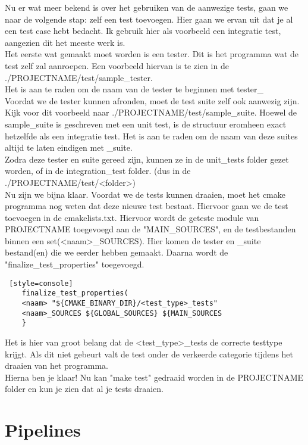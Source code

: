 \documentclass{article}
\begin{document}
Nu er wat meer bekend is over het gebruiken van de aanwezige tests, gaan we naar de volgende stap: zelf een test toevoegen. Hier gaan we ervan uit dat je al een test case hebt bedacht. 
Ik gebruik hier als voorbeeld een integratie test, aangezien dit het meeste werk is. 
\\
Het eerste wat gemaakt moet worden is een tester. Dit is het programma wat de test zelf zal aanroepen. Een voorbeeld hiervan is te zien in de \\ ./PROJECTNAME/test/sample\_tester. \\Het is aan te raden om de naam van de tester te beginnen met tester\_<de rest> 
\\
Voordat we de tester kunnen afronden, moet de test suite zelf ook aanwezig zijn. Kijk voor dit voorbeeld naar ./PROJECTNAME/test/sample\_suite. Hoewel de sample\_suite is geschreven met een unit test, is de structuur eromheen exact hetzelfde als een integratie test. Het is aan te raden om de naam van deze suites altijd te laten eindigen met \_suite.  
\\
Zodra deze tester en suite gereed zijn, kunnen ze in de unit\_tests folder gezet worden, of in de integration\_test folder. (dus in de ./PROJECTNAME/test/<folder>) 
\\
Nu zijn we bijna klaar. Voordat we de tests kunnen draaien, moet het cmake programma nog   weten dat deze nieuwe test bestaat. Hiervoor gaan  we de test toevoegen in de cmakelists.txt. Hiervoor wordt de geteste module van PROJECTNAME toegevoegd aan de "MAIN\_SOURCES", en de testbestanden binnen een set(<naam>\_SOURCES). Hier komen de tester en \_suite bestand(en) die we eerder hebben gemaakt. 
\newpage
Daarna wordt de "finalize\_test\_properties" toegevoegd. 
\\
\begin{lstlisting} [style=console]
    finalize_test_properties(
    <naam> "${CMAKE_BINARY_DIR}/<test_type>_tests"
    <naam>_SOURCES ${GLOBAL_SOURCES} ${MAIN_SOURCES
    }
\end{lstlisting}

Het is hier van groot belang dat de <test\_type>\_tests de correcte testtype krijgt. Als dit niet gebeurt valt de test onder de verkeerde categorie tijdens het draaien van het programma. 
\\
Hierna ben je klaar! Nu kan "make test" gedraaid worden in de PROJECTNAME folder en kun je zien dat al je tests draaien. 

\section{Pipelines}
\end{document}
